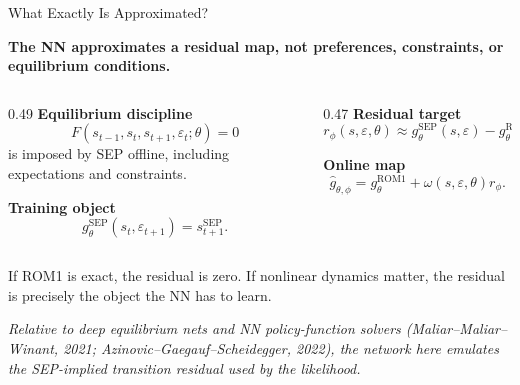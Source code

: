 \documentclass[aspectratio=169,10pt]{beamer}
\newcommand{\sep}{\mathrm{SEP}}
\newcommand{\rom}{\mathrm{ROM1}}
\newcommand{\eps}{\varepsilon}
\newcommand{\state}{s}
\newcommand{\sourcefoot}[1]{%
  \vspace{-0.55em}
  \begin{flushleft}
  \parbox{0.96\linewidth}{\raggedright\tiny\textit{#1}}
  \end{flushleft}
}
\newcommand{\claim}[1]{%
  \begin{center}
  \parbox{0.94\linewidth}{\centering\large\bfseries #1}
  \end{center}
}
\begin{document}
\begin{frame}{What Exactly Is Approximated?}
\claim{The NN approximates a residual map, not preferences, constraints, or equilibrium conditions.}

\vspace{0.35em}
\begin{columns}[T,onlytextwidth]
\begin{column}{0.49\textwidth}
\textbf{Equilibrium discipline}
\[
  F(\state_{t-1},\state_t,\state_{t+1},\eps_t;\theta)=0
\]
is imposed by SEP offline, including expectations and constraints.

\vspace{0.5em}
\textbf{Training object}
\[
  g^{\sep}_{\theta}(\state_t,\eps_{t+1})
  =
  \state_{t+1}^{\sep}.
\]
\end{column}
\begin{column}{0.47\textwidth}
\textbf{Residual target}
\[
  r_{\phi}(\state,\eps,\theta)
  \approx
  g^{\sep}_{\theta}(\state,\eps)
  -
  g^{\rom}_{\theta}(\state,\eps).
\]

\vspace{0.5em}
\textbf{Online map}
\[
  \widehat g_{\theta,\phi}
  =
  g^{\rom}_{\theta}
  +
  \omega(\state,\eps,\theta)r_{\phi}.
\]
\end{column}
\end{columns}

\vspace{0.45em}
\begin{center}
\small If ROM1 is exact, the residual is zero. If nonlinear dynamics matter, the residual is precisely the object the NN has to learn.
\end{center}
\sourcefoot{Relative to deep equilibrium nets and NN policy-function solvers (Maliar--Maliar--Winant, 2021; Azinovic--Gaegauf--Scheidegger, 2022), the network here emulates the SEP-implied transition residual used by the likelihood.}
\end{frame}
\end{document}
